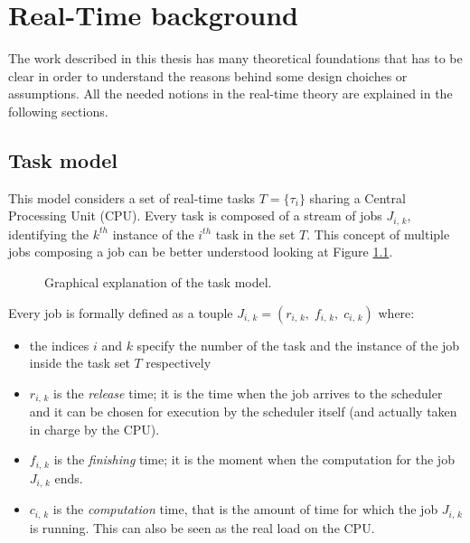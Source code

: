 \chapter{Real-Time background} \label{cha:rt_background}

The work described in this thesis has many theoretical foundations that has to be
clear in order to understand the reasons behind some design choiches or assumptions. 
All the needed notions in the real-time theory are explained in the following sections.


\section{Task model} \label{sec:task_model}
This model considers a set of real-time tasks \( T = \{\tau_{i}\} \)
sharing a Central Processing Unit (CPU). Every task
is composed of a stream of jobs \( J_{i,\,k} \), identifying the \( k^{th} \)
instance of the \( i^{th} \) task in the set \( T \). This concept of multiple
jobs composing a job can be better understood looking at Figure \ref{img:task_model}.
\begin{figure}[!htb]\label{img:task_model}
    \caption{Graphical explanation of the task model.}
\end{figure}

Every job is formally defined as a touple
\( J_{i,\,k} = \left(r_{i,\,k}, \;f_{i,\,k}, \;c_{i,\,k}\right) \) where:
\begin{itemize}
    \item the indices \( i \) and \( k \) specify the number of the task and the
        instance of the job inside the task set \( T \) respectively
    \item \( r_{i,\,k} \) is the \emph{release} time; it is the time when
        the job arrives to the scheduler and it can be chosen for execution
        by the scheduler itself (and actually taken in charge by the CPU).
    \item \( f_{i,\,k} \) is the \emph{finishing} time; it is the moment when
        the computation for the job \( J_{i,\,k} \) ends.
    \item \( c_{i,\,k} \) is the \emph{computation} time, that is the amount of
        time for which the job \( J_{i,\,k} \) is running. This can also be seen
        as the real load on the CPU.
\end{itemize} 

